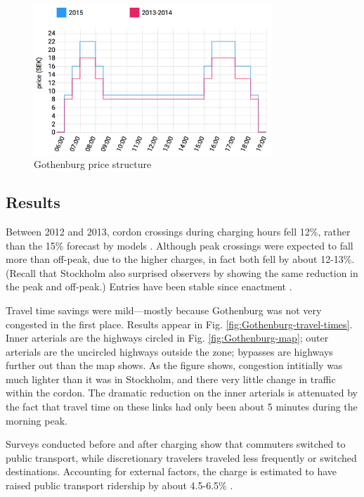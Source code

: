\begin{figure}
    \includegraphics[width=0.8\textwidth]{../img/gothenburg-prices.png}
    \caption{Gothenburg price structure } 
    \label{fig:gothenburg-prices}
\end{figure}

\subsection{Results}

Between 2012 and 2013, cordon crossings during charging hours fell 12\%, rather than the 15\% forecast by models \citep{Borjesson2015}. Although peak crossings were expected to fall more than off-peak, due to the higher charges, in fact both fell by about 12-13\%. (Recall that Stockholm also surprised observers by showing the same reduction in the peak and off-peak.) Entries have been stable since enactment \citet[Tab. 5]{Borjesson2018}.

Travel time savings were mild---mostly because Gothenburg was not very congested in the first place. Results appear in Fig. \ref{fig:Gothenburg-travel-times}. Inner arterials are the highways circled in Fig. \ref{fig:Gothenburg-map}; outer arterials are the uncircled highways outside the zone; bypasses are highways further out than the map shows. As the figure shows, congestion intitially was much lighter than it was in Stockholm, and there very little change in traffic within the cordon. The dramatic reduction on the inner arterials is attenuated by the fact that travel time on these links had only been about 5 minutes during the morning peak. 

Surveys conducted before and after charging show that commuters switched to public transport, while discretionary travelers traveled less frequently or switched destinations. Accounting for external factors, the charge is estimated to have raised public transport ridership by about 4.5-6.5\% \citep{Borjesson2015}.

